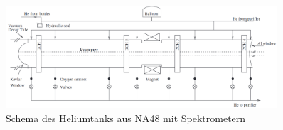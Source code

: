 \documentclass[aspectratio=1610, professionalfonts, 9pt, t]{beamer}
\begin{document}
  \begin{frame}
    \begin{figure}[ht]
      \begin{center}
        \includegraphics[width=0.9\textwidth]{Images/na48helium.png} %
        \caption{Schema des Heliumtanks aus NA48 mit Spektrometern}
      \end{center}
    \end{figure}
  \end{frame}
\end{document}
